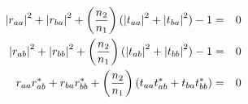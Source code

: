 \begin{eqnarray}
\abs{r_{aa}}^2+\abs{r_{ba}}^2+\left(\frac{n_2}{n_1}\right)(\abs{t_{aa}}^2+\abs{t_{ba}}^2)-1&=&0\label{eq:energyconservationa}\\
\abs{r_{ab}}^2+\abs{r_{bb}}^2+\left(\frac{n_2}{n_1}\right)(\abs{t_{ab}}^2+\abs{t_{bb}}^2)-1&=&0\label{eq:energyconservationb}\\
r_{aa}r_{ab}^*+r_{ba}r_{bb}^*+\left(\frac{n_2}{n_1}\right)(t_{aa}t_{ab}^*+t_{ba}t_{bb}^*) &=& 0 \label{eq:energyconservationredistribution}
\end{eqnarray}